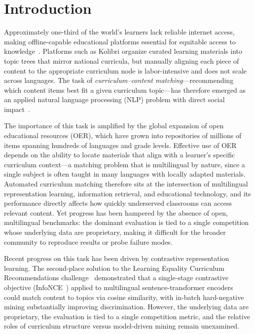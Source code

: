 \documentclass[applsci,article,submit,pdftex,moreauthors]{Definitions/mdpi}
\begin{document}
\section{Introduction}

Approximately one-third of the world's learners lack reliable internet access, making offline-capable educational platforms essential for equitable access to knowledge~\cite{kolibri}. Platforms such as Kolibri organize curated learning materials into topic trees that mirror national curricula, but manually aligning each piece of content to the appropriate curriculum node is labor-intensive and does not scale across languages. The task of \emph{curriculum--content matching}---recommending which content items best fit a given curriculum topic---has therefore emerged as an applied natural language processing (NLP) problem with direct social impact~\cite{lecr-kaggle}.

The importance of this task is amplified by the global expansion of open educational resources (OER), which have grown into repositories of millions of items spanning hundreds of languages and grade levels. Effective use of OER depends on the ability to locate materials that align with a learner's specific curriculum context---a matching problem that is multilingual by nature, since a single subject is often taught in many languages with locally adapted materials. Automated curriculum matching therefore sits at the intersection of multilingual representation learning, information retrieval, and educational technology, and its performance directly affects how quickly underserved classrooms can access relevant content. Yet progress has been hampered by the absence of open, multilingual benchmarks: the dominant evaluation is tied to a single competition whose underlying data are proprietary, making it difficult for the broader community to reproduce results or probe failure modes.

Recent progress on this task has been driven by contrastive representation learning. The second-place solution to the Learning Equality Curriculum Recommendations challenge~\cite{habel2023} demonstrated that a single-stage contrastive objective (InfoNCE~\cite{oord2018cpc}) applied to multilingual sentence-transformer encoders~\cite{reimers2019sbert,labse,mpnet} could match content to topics via cosine similarity, with in-batch hard-negative mining substantially improving discrimination. However, the underlying data are proprietary, the evaluation is tied to a single competition metric, and the relative roles of curriculum structure versus model-driven mining remain unexamined.
\end{document}
